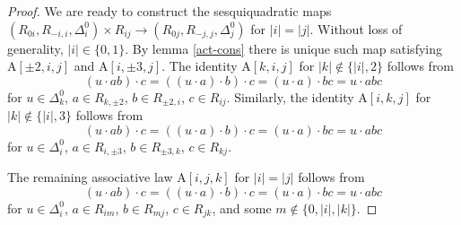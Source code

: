 \documentclass{article}
\theoremstyle{definition}
\begin{document}
\begin{proof}
    We are ready to construct the sesquiquadratic maps \(
        (R_{0i}, R_{-i, i}, \Delta^0_i) \times R_{ij}
        \to (R_{0j}, R_{-j, j}, \Delta^0_j)
    \) for \(|i| = |j|\). Without loss of generality, \(|i| \in \{0, 1\}\). By lemma \ref{act-cons} there is unique such map satisfying \(\mathrm A[\pm 2, i, j]\) and \(\mathrm A[i, \pm 3, j]\). The identity \(\mathrm A[k, i, j]\) for \(|k| \notin \{|i|, 2\}\) follows from \[
        (u \cdot ab) \cdot c
        =
        ((u \cdot a) \cdot b) \cdot c
        =
        (u \cdot a) \cdot bc
        =
        u \cdot abc
    \] for \(u \in \Delta^0_k\), \(a \in R_{k, \pm 2}\), \(b \in R_{\pm 2, i}\), \(c \in R_{ij}\). Similarly, the identity \(\mathrm A[i, k, j]\) for \(|k| \notin \{|i|, 3\}\) follows from \[
        (u \cdot ab) \cdot c
        =
        ((u \cdot a) \cdot b) \cdot c
        =
        (u \cdot a) \cdot bc
        =
        u \cdot abc
    \] for \(u \in \Delta^0_i\), \(a \in R_{i, \pm 3}\), \(b \in R_{\pm 3, k}\), \(c \in R_{kj}\).

    The remaining associative law \(\mathrm A[i, j, k]\) for \(|i| = |j|\) follows from \[
        (u \cdot ab) \cdot c
        =
        ((u \cdot a) \cdot b) \cdot c
        =
        (u \cdot a) \cdot bc
        =
        u \cdot abc
    \] for \(u \in \Delta^0_i\), \(a \in R_{im}\), \(b \in R_{mj}\), \(c \in R_{jk}\), and some \(m \notin \{0, |i|, |k|\}\).
\end{proof}
\end{document}
